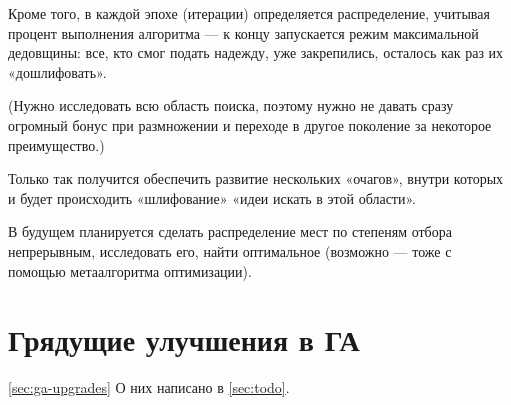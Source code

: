 Кроме того, в каждой эпохе (итерации) определяется распределение, учитывая процент выполнения алгоритма
— к концу запускается режим максимальной дедовщины: все, кто смог подать надежду, уже закрепились, осталось как раз их «дошлифовать».

(Нужно исследовать всю область поиска,
поэтому нужно не давать сразу огромный бонус при размножении и переходе в другое поколение за некоторое преимущество.)

Только так получится обеспечить развитие нескольких «очагов», внутри которых и будет происходить «шлифование» «идеи искать в этой области».

В будущем планируется сделать распределение мест по степеням отбора непрерывным,
исследовать его, найти оптимальное (возможно — тоже с помощью метаалгоритма оптимизации).


\section{Грядущие улучшения в ГА}\ref{sec:ga-upgrades}
О них написано в \ref{sec:todo}.
